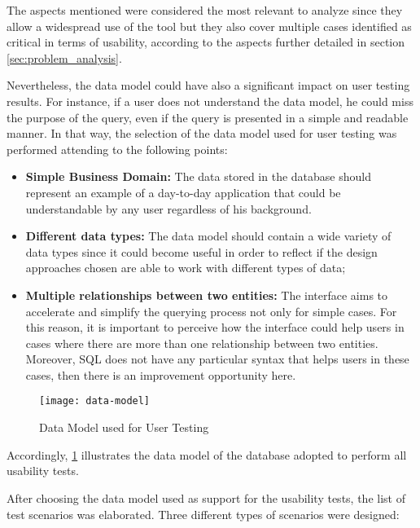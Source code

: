 The aspects mentioned were considered the most relevant to analyze since they allow a widespread use of the tool but they also cover multiple cases identified as critical in terms of usability, according to the aspects further detailed in section \ref{sec:problem_analysis}.

Nevertheless, the data model could have also a significant impact on user testing results. For instance, if a user does not understand the data model, he could miss the purpose of the query, even if the query is presented in a simple and readable manner. In that way, the selection of the data model used for user testing was performed attending to the following points:

\begin{itemize}
    \item \textbf{Simple Business Domain: }The data stored in the database should represent an example of a day-to-day application that could be understandable by any user regardless of his background.
    \item \textbf{Different data types: }The data model should contain a wide variety of data types since it could become useful in order to reflect if the design approaches chosen are able to work with different types of data;
    \item \textbf{Multiple relationships between two entities: }The interface aims to accelerate and simplify the querying process not only for simple cases. For this reason, it is important to perceive how the interface could help users in cases where there are more than one relationship between two entities. Moreover, \gls{SQL} does not have any particular syntax that helps users in these cases, then there is an improvement opportunity here.
\end{itemize}

\begin{figure}[htbp]
	\centering
	\texttt{[image: data-model]}
	\caption{Data Model used for User Testing}
	\label{fig:dataModel}
\end{figure}

Accordingly, \ref{fig:dataModel} illustrates the data model of the database adopted to perform all usability tests.

After choosing the data model used as support for the usability tests, the list of test scenarios was elaborated. Three different types of scenarios were designed:


